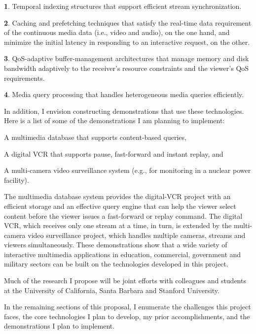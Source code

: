 \begin{nlist}
\item {\bf 1}.
Temporal indexing structures that support
efficient stream synchronization.
\item {\bf 2}. Caching and prefetching techniques that satisfy
the real-time data requirement of the continuous media data
(i.e., video and audio), on the one hand, and minimize the
initial latency in responding to an interactive request,
on the other.
\item {\bf 3}.
QoS-adaptive buffer-management architectures that manage
memory and disk bandwidth adaptively to
the receiver's resource constraints and
the viewer's QoS requirements.
\item {\bf 4}.
Media query processing that handles heterogeneous
media queries efficiently.
\end{nlist}   

In addition, I envision constructing demonstrations
that use these technologies.
Here is a list of some of the demonstrations I am planning
to implement:
\begin{jlist}
\item 
A multimedia database that supports content-based
queries,
\item 
A digital VCR that supports pause, fast-forward and instant
replay, and
\item 
A multi-camera video surveillance system (e.g., for
monitoring in a nuclear power facility).
\end{jlist}

The multimedia database system provides the digital-VCR
project with an efficient storage and an effective query
engine that can help the viewer select content
before the viewer issues a fast-forward or replay command.
The digital VCR, which receives only one stream at a time,
in turn, is extended by the multi-camera video surveillance project,
which handles multiple cameras, streams and viewers simultaneously.
These demonstrations show that 
a wide variety of interactive multimedia applications
in education, commercial, government and
military sectors can be built on the technologies
developed in this project.
                           
Much of the research I propose will be joint efforts
with colleagues and students at the University of California,
Santa Barbara and Stanford University.

In the remaining sections of this proposal, I enumerate the challenges
this project faces, the core technologies I plan to develop, 
my prior accomplishments, and
the demonstrations I plan to implement.   

